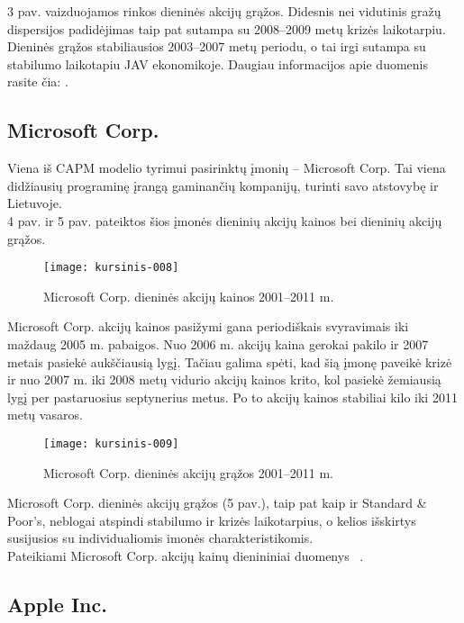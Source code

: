 \documentclass[12pt, a14paper, lithuanian]{article}
\begin{document}
3 pav. vaizduojamos rinkos dieninės akcijų grąžos. Didesnis nei vidutinis gražų dispersijos padidėjimas
taip pat sutampa su 2008--2009 metų krizės laikotarpiu. Dieninės grąžos stabiliausios 2003--2007 metų periodu,
o tai irgi sutampa su stabilumo laikotapiu JAV ekonomikoje. Daugiau informacijos apie duomenis rasite čia: \cite{market}.    \\


\subsection{Microsoft Corp.}

Viena iš CAPM modelio tyrimui pasirinktų įmonių -- Microsoft Corp. Tai viena didžiausių programinę įrangą
 gaminančių kompanijų, turinti savo atstovybę ir Lietuvoje. \\
 
 4 pav. ir 5 pav. pateiktos šios įmonės dieninių akcijų kainos
 bei dieninių akcijų grąžos.
 
\begin{figure}[H]
  \centering
\texttt{[image: kursinis-008]}
  \caption{Microsoft Corp. dieninės akcijų kainos 2001--2011 m.}
  \label{fig:4}
\end{figure}

Microsoft Corp. akcijų kainos pasižymi gana periodiškais svyravimais iki maždaug 2005 m. pabaigos. Nuo 2006 m.
akcijų kaina gerokai pakilo ir 2007 metais pasiekė aukščiausią lygį. Tačiau galima spėti, kad šią įmonę paveikė
krizė ir nuo 2007 m. iki 2008 metų vidurio akcijų kainos krito, kol pasiekė žemiausią lygį per pastaruosius septynerius metus. Po to
akcijų kainos stabiliai kilo iki 2011 metų vasaros.

\begin{figure}[H]
  \centering
\texttt{[image: kursinis-009]}
  \caption{Microsoft Corp. dieninės akcijų grąžos 2001--2011 m. }
  \label{fig:5}
\end{figure}
             
Microsoft Corp. dieninės akcijų grąžos (5 pav.), taip pat kaip ir Standard \& Poor's, neblogai atspindi stabilumo ir
krizės laikotarpius, o kelios išskirtys susijusios su individualiomis imonės charakteristikomis. \\

Pateikiami Microsoft Corp. akcijų kainų dienininiai duomenys~\cite{microsoft} .


\subsection{Apple Inc.}
\end{document}

